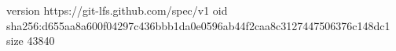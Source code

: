 version https://git-lfs.github.com/spec/v1
oid sha256:d655aa8a600f04297c436bbb1da0e0596ab44f2caa8c3127447506376c148dc1
size 43840
